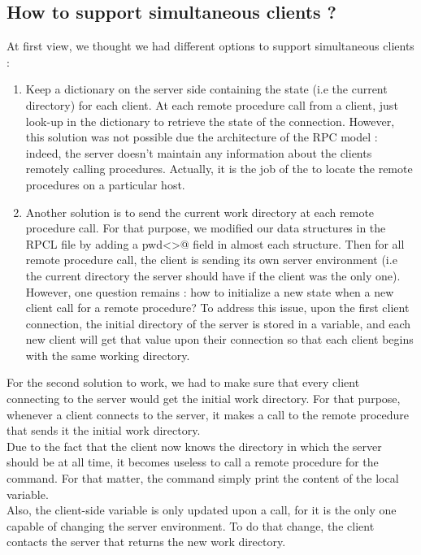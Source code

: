 \documentclass{article}
\begin{document}
\subsection{How to support simultaneous clients ?}
At first view, we thought we had different options to support simultaneous clients :
\begin{enumerate}
\item Keep a dictionary on the server side containing the state (i.e the current directory) for each client. At each remote procedure call from a client, just look-up in the dictionary to retrieve the state of the connection. However, this solution was not possible due the architecture of the RPC model : indeed, the server doesn't maintain any information about the clients remotely calling procedures. Actually, it is the job of the \verb@PortMapper@ to locate the remote procedures on a particular host.
\item Another solution is to send the current work directory at each remote procedure call. For that purpose, we modified our data structures in the RPCL file by adding a \verb@string pwd<>@ field in almost each structure. Then for all remote procedure call, the client is sending its own server environment (i.e the current directory the server should have if the client was the only one). However, one question remains : how to initialize a new state when a new client call for a remote procedure? To address this issue, upon the first client connection, the initial directory of the server is stored in a variable, and each new client will get that value upon their connection so that each client begins with the same working directory.
\end{enumerate}
For the second solution to work, we had to make sure that every client connecting to the server would get the initial work directory.
For that purpose, whenever a client connects to the server, it makes a call to the remote procedure \verb@pwd@ that sends it the initial work directory. \\
Due to the fact that the client now knows the directory in which the server should be at all time, it becomes useless to call a remote procedure for the \verb@pwd@ command. For that matter, the command simply print the content of the local variable.\\
Also, the client-side \verb@pwd@ variable is only updated upon a \verb@cd@ call, for it is the only one capable of changing the server environment. To do that change, the client contacts the server that returns the new work directory.
\end{document}
